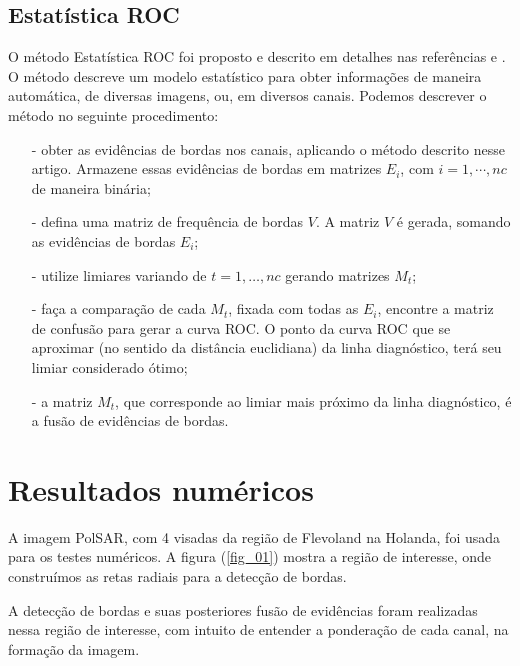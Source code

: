 \documentclass[conference]{IEEEtran}
\begin{document}
\subsection{Estatística ROC}
O método Estatística ROC foi proposto e descrito em detalhes nas referências \cite{gs} e \cite{fawcett}. O método descreve um modelo estatístico para obter informações de maneira automática, de diversas imagens, ou, em diversos canais. Podemos descrever o método no seguinte procedimento:
\begin{itemize}
\item[-] obter as evidências de bordas nos canais, aplicando o método descrito nesse artigo. Armazene essas evidências de bordas em matrizes $E_i$, com $i=1,\cdots,nc$ de maneira binária;
\item[-] defina uma matriz de frequência de bordas $V$. A matriz  $V$ é gerada, somando as evidências de bordas $E_i$;
\item[-] utilize limiares variando de $t=1,\dots,nc$ gerando matrizes $M_t$;
\item[-] faça a comparação de cada $M_t$, fixada com todas as $E_i$,  encontre a matriz de confusão para gerar a curva ROC. O ponto da curva ROC que se aproximar (no sentido da distância euclidiana) da linha diagnóstico, terá seu limiar considerado ótimo;
\item[-] a matriz $M_t$, que corresponde ao limiar mais próximo da linha diagnóstico, é a fusão de evidências de bordas.
\end{itemize}
  
\section{Resultados numéricos}\label{sec_07}

A imagem PolSAR, com 4 visadas da região de Flevoland na Holanda, foi usada para os testes numéricos. A figura (\ref{fig_01}) mostra a região de interesse, onde construímos as retas radiais para a detecção de bordas.

 A detecção de bordas e suas posteriores fusão de evidências foram realizadas nessa região de interesse, com intuito de entender a ponderação de cada canal, na formação da imagem.
\end{document}
